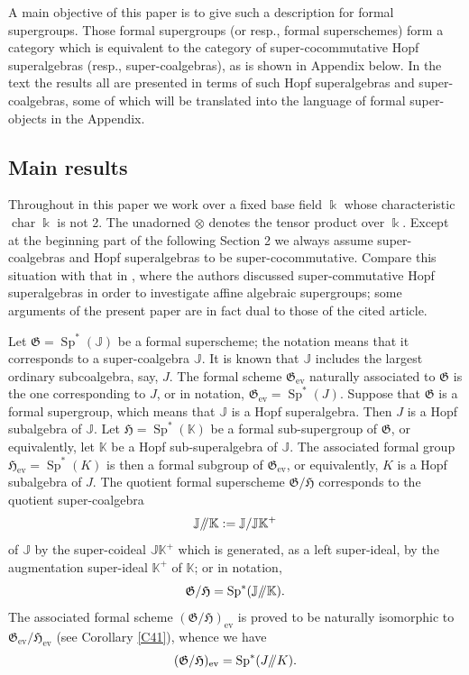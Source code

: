 \documentclass[11pt, a4paper]{amsart}
\theoremstyle{definition}
\numberwithin{equation}{section}
\begin{document}
A main objective of this paper is to give such a description for formal supergroups. 
Those formal supergroups (or resp., formal superschemes) form a category which is equivalent to the category of super-cocommutative Hopf
superalgebras (resp., super-coalgebras), as is shown in Appendix below. 
In the text the results all are presented in terms of
such Hopf superalgebras and super-coalgebras, some of which will be translated into the language of formal super-objects in the Appendix.

\subsection{Main results}
Throughout in this paper we work over a fixed base field $\Bbbk$ whose characteristic 
$\operatorname{char} \Bbbk$ is not 2.
The unadorned $\otimes$ denotes the tensor product over $\Bbbk$. 
Except at the beginning part of the following Section 2 we always assume super-coalgebras and Hopf superalgebras to be super-cocommutative. 
Compare this situation with that in \cite{MT}, where the authors discussed super-commutative Hopf superalgebras
in order to investigate affine algebraic supergroups; some arguments of the present paper are in fact dual to
those of the cited article.

Let $\mathfrak{G}=\operatorname{Sp}^*(\mathbb{J})$ be a formal superscheme; the notation means
that it corresponds to a super-coalgebra $\mathbb{J}$. It is known that $\mathbb{J}$ includes the largest ordinary subcoalgebra, say, $J$. The formal scheme $\mathfrak{G}_{\mathrm{ev}}$ naturally associated to $\mathfrak{G}$
is the one corresponding to $J$, or in notation, $\mathfrak{G}_{\mathrm{ev}}=\operatorname{Sp}^*(J)$.
Suppose that $\mathfrak{G}$ is a formal supergroup, which means that $\mathbb{J}$ is a Hopf superalgebra.
Then $J$ is a Hopf subalgebra of $\mathbb{J}$. Let $\mathfrak{H}=\operatorname{Sp}^*(\mathbb{K})$
be a formal sub-supergroup of $\mathfrak{G}$, or equivalently, let $\mathbb{K}$ be a Hopf sub-superalgebra 
of $\mathbb{J}$. The associated formal group $\mathfrak{H}_{\mathrm{ev}}=\operatorname{Sp}^*(K)$
is then a formal subgroup of $\mathfrak{G}_{\mathrm{ev}}$, or equivalently, $K$ is a Hopf subalgebra of $J$.
The quotient formal superscheme $\mathfrak{G}/\mathfrak{H}$ corresponds to the quotient super-coalgebra
\[
\mathbb{J}/\hspace{-1mm}/\mathbb{K}:=\mathbb{J}/\mathbb{J}\mathbb{K}^+
\]
of $\mathbb{J}$ by the super-coideal $\mathbb{J}\mathbb{K}^+$ which is generated, as a left super-ideal, by
the augmentation super-ideal $\mathbb{K}^+$ of $\mathbb{K}$; or in notation, 
\[
\mathfrak{G}/\mathfrak{H}=\operatorname{Sp}^*(\mathbb{J}/\hspace{-1mm}/\mathbb{K}). 
\]
The associated formal scheme $(\mathfrak{G}/\mathfrak{H})_{\mathrm{ev}}$ is proved to be naturally isomorphic to
$\mathfrak{G}_{\mathrm{ev}}/\mathfrak{H}_{\mathrm{ev}}$ (see Corollary \ref{C41}), whence we have
\[
(\mathfrak{G}/\mathfrak{H})_{\mathrm{ev}}
=\operatorname{Sp}^*(J/\hspace{-1mm}/K). 
\]
\end{document}
